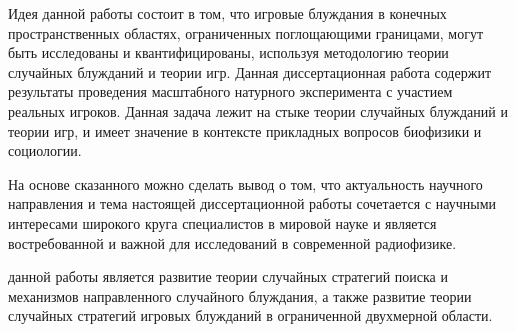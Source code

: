 Идея данной работы состоит в том, что игровые блуждания в конечных пространственных областях, ограниченных поглощающими границами, могут быть исследованы и квантифицированы, используя методологию теории случайных блужданий и теории игр. Данная диссертационная работа содержит результаты проведения масштабного натурного эксперимента с участием реальных игроков. Данная задача лежит на стыке теории случайных блужданий и теории игр, и имеет значение в контексте прикладных вопросов биофизики и социологии.

На основе сказанного можно сделать вывод о том, что актуальность научного направления и тема настоящей диссертационной работы сочетается с научными интересами широкого круга специалистов в мировой науке и является востребованной и важной для исследований в современной радиофизике.


\ifsynopsis
\else
\fi


{\aim} данной работы является развитие теории случайных стратегий поиска и механизмов направленного случайного блуждания, а также развитие теории случайных стратегий игровых блужданий в ограниченной двухмерной области.

